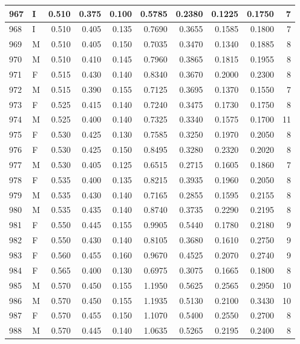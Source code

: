 \documentclass[9pt,twocolumn,twoside,]{pnas-new}
\begin{document}
\begin{tabular}{l|l|r|r|r|r|r|r|r|r}
\hline
967 & I & 0.510 & 0.375 & 0.100 & 0.5785 & 0.2380 & 0.1225 & 0.1750 & 7\\
\hline
968 & I & 0.510 & 0.405 & 0.135 & 0.7690 & 0.3655 & 0.1585 & 0.1800 & 7\\
\hline
969 & M & 0.510 & 0.405 & 0.150 & 0.7035 & 0.3470 & 0.1340 & 0.1885 & 8\\
\hline
970 & M & 0.510 & 0.410 & 0.145 & 0.7960 & 0.3865 & 0.1815 & 0.1955 & 8\\
\hline
971 & F & 0.515 & 0.430 & 0.140 & 0.8340 & 0.3670 & 0.2000 & 0.2300 & 8\\
\hline
972 & M & 0.515 & 0.390 & 0.155 & 0.7125 & 0.3695 & 0.1370 & 0.1550 & 7\\
\hline
973 & F & 0.525 & 0.415 & 0.140 & 0.7240 & 0.3475 & 0.1730 & 0.1750 & 8\\
\hline
974 & M & 0.525 & 0.400 & 0.140 & 0.7325 & 0.3340 & 0.1575 & 0.1700 & 11\\
\hline
975 & F & 0.530 & 0.425 & 0.130 & 0.7585 & 0.3250 & 0.1970 & 0.2050 & 8\\
\hline
976 & F & 0.530 & 0.425 & 0.150 & 0.8495 & 0.3280 & 0.2320 & 0.2020 & 8\\
\hline
977 & M & 0.530 & 0.405 & 0.125 & 0.6515 & 0.2715 & 0.1605 & 0.1860 & 7\\
\hline
978 & F & 0.535 & 0.400 & 0.135 & 0.8215 & 0.3935 & 0.1960 & 0.2050 & 8\\
\hline
979 & M & 0.535 & 0.430 & 0.140 & 0.7165 & 0.2855 & 0.1595 & 0.2155 & 8\\
\hline
980 & M & 0.535 & 0.435 & 0.140 & 0.8740 & 0.3735 & 0.2290 & 0.2195 & 8\\
\hline
981 & F & 0.550 & 0.445 & 0.155 & 0.9905 & 0.5440 & 0.1780 & 0.2180 & 9\\
\hline
982 & F & 0.550 & 0.430 & 0.140 & 0.8105 & 0.3680 & 0.1610 & 0.2750 & 9\\
\hline
983 & F & 0.560 & 0.455 & 0.160 & 0.9670 & 0.4525 & 0.2070 & 0.2740 & 9\\
\hline
984 & F & 0.565 & 0.400 & 0.130 & 0.6975 & 0.3075 & 0.1665 & 0.1800 & 8\\
\hline
985 & M & 0.570 & 0.450 & 0.155 & 1.1950 & 0.5625 & 0.2565 & 0.2950 & 10\\
\hline
986 & M & 0.570 & 0.450 & 0.155 & 1.1935 & 0.5130 & 0.2100 & 0.3430 & 10\\
\hline
987 & F & 0.570 & 0.455 & 0.150 & 1.1070 & 0.5400 & 0.2550 & 0.2700 & 8\\
\hline
988 & M & 0.570 & 0.445 & 0.140 & 1.0635 & 0.5265 & 0.2195 & 0.2400 & 8\\

\end{tabular}
\end{document}
